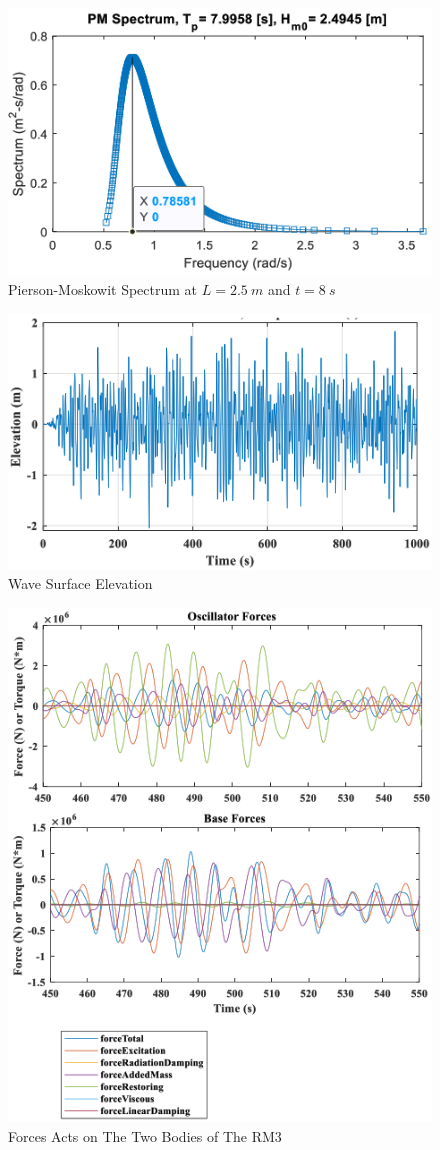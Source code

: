\documentclass[conference]{IEEEtran}
\begin{document}
\begin{figure}[htbp]
	\centerline{\includegraphics[width=2.9 in]{fig/6.png}}
	\caption{Pierson-Moskowit Spectrum at $L=2.5\ m$ and $t=8\ s$}
	\label{pm}
\end{figure}
\begin{figure}[htbp]
	\centerline{\includegraphics[width=3.3 in]{fig/7.png}}
	\caption{Wave Surface Elevation}
	\label{WSE}
\end{figure}
\begin{figure}[htbp]
		\centerline{\includegraphics[width=3.3 in]{fig/8.png}}
	\caption{ Forces Acts on The Two Bodies of The RM3 }
	\label{FaT}
\end{figure}
\end{document}
